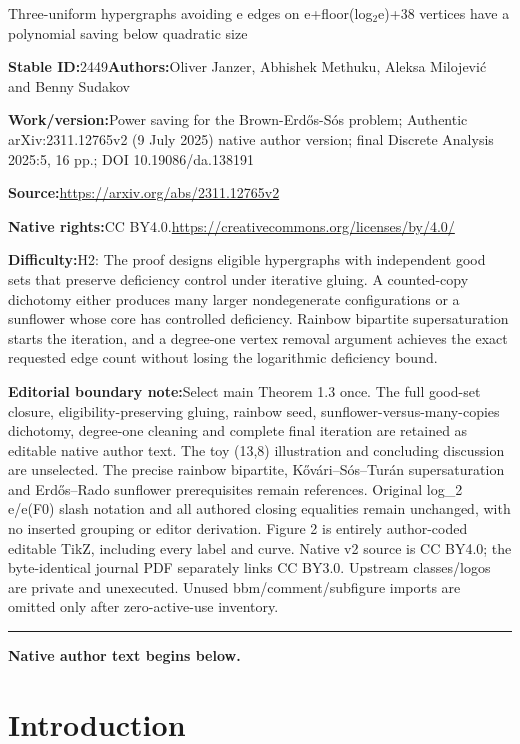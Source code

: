 \documentclass[11pt]{article}
\numberwithin{equation}{section}
\theoremstyle{plain}
\theoremstyle{remark}
\begin{document}
\begin{center}\Large Three-uniform hypergraphs avoiding e edges on e+floor(log$_2$e)+38 vertices have a polynomial saving below quadratic size\end{center}\noindent\textbf{Stable ID:}2449\quad\textbf{Authors:}Oliver Janzer, Abhishek Methuku, Aleksa Milojević and Benny Sudakov\par\noindent\textbf{Work/version:}Power saving for the Brown-Erdős-Sós problem; Authentic arXiv:2311.12765v2 (9 July 2025) native author version; final Discrete Analysis 2025:5, 16 pp.; DOI 10.19086/da.138191\par\noindent\textbf{Source:}\url{https://arxiv.org/abs/2311.12765v2}\par\noindent\textbf{Native rights:}CC BY4.0.\url{https://creativecommons.org/licenses/by/4.0/}\par\noindent\textbf{Difficulty:}H2: The proof designs eligible hypergraphs with independent good sets that preserve deficiency control under iterative gluing. A counted-copy dichotomy either produces many larger nondegenerate configurations or a sunflower whose core has controlled deficiency. Rainbow bipartite supersaturation starts the iteration, and a degree-one vertex removal argument achieves the exact requested edge count without losing the logarithmic deficiency bound.\par\medskip\noindent\textbf{Editorial boundary note:}Select main Theorem 1.3 once. The full good-set closure, eligibility-preserving gluing, rainbow seed, sunflower-versus-many-copies dichotomy, degree-one cleaning and complete final iteration are retained as editable native author text. The toy (13,8) illustration and concluding discussion are unselected. The precise rainbow bipartite, Kővári–Sós–Turán supersaturation and Erdős–Rado sunflower prerequisites remain references. Original log\_2 e/e(F0) slash notation and all authored closing equalities remain unchanged, with no inserted grouping or editor derivation. Figure 2 is entirely author-coded editable TikZ, including every label and curve. Native v2 source is CC BY4.0; the byte-identical journal PDF separately links CC BY3.0. Upstream classes/logos are private and unexecuted. Unused bbm/comment/subfigure imports are omitted only after zero-active-use inventory.\par\medskip\hrule\medskip\noindent\textbf{Native author text begins below.}\par

\section{Introduction}
\end{document}

